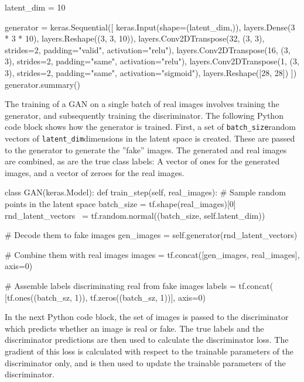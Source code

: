 \begin{withcode}
\begin{pythoncode}
latent_dim = 10

generator = keras.Sequential([
    keras.Input(shape=(latent_dim,)),
    layers.Dense(3 * 3 * 10),
    layers.Reshape((3, 3, 10)),
    layers.Conv2DTranspose(32, (3, 3), strides=2, 
        padding="valid", activation="relu"),
    layers.Conv2DTranspose(16, (3, 3), strides=2, 
        padding="same", activation="relu"),
    layers.Conv2DTranspose(1, (3, 3), strides=2, 
        padding="same", activation="sigmoid"),
    layers.Reshape([28, 28])
])
generator.summary()
\end{pythoncode}

The training of a GAN on a single batch of real images involves training the generator, and subsequently training the discriminator. The following Python code block shows how the generator is trained. First, a set of \small\texttt{batch\_size}\normalsize random vectors of \small\texttt{latent\_dim}\normalsize dimensions in the latent space is created. These are passed to the generator to generate the ''fake'' images. The generated and real images are combined, as are the true class labels: A vector of ones for the generated images, and a vector of zeroes for the real images. 

\begin{pythoncode}
class GAN(keras.Model):
    def train_step(self, real_images):
        # Sample random points in the latent space
        batch_size = tf.shape(real_images)[0]
        rnd_latent_vectors \
            = tf.random.normal((batch_size, self.latent_dim))

        # Decode them to fake images
        gen_images = self.generator(rnd_latent_vectors)

        # Combine them with real images
        images = tf.concat([gen_images, real_images], axis=0)

        # Assemble labels discriminating real from fake images
        labels = tf.concat(
            [tf.ones((batch_sz, 1)), 
            tf.zeros((batch_sz, 1))], axis=0)
\end{pythoncode}

In the next Python code block, the set of images is passed to the discriminator which predicts whether an image is real or fake. The true labels and the discriminator predictions are then used to calculate the discriminator loss. The gradient of this loss is calculated with respect to the trainable parameters of the discriminator only, and is then used to update the trainable parameters of the discriminator.


\end{withcode}
